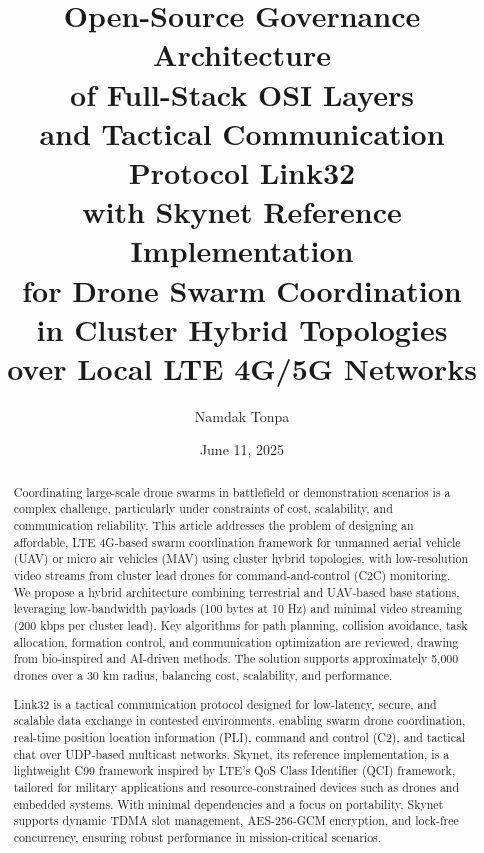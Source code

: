 \documentclass{article}
\begin{document}

\title { Open-Source Governance Architecture       \\
         of Full-Stack OSI Layers                   \\
         and Tactical Communication Protocol Link32  \\
         with Skynet Reference Implementation         \\
         for Drone Swarm Coordination \\
         in Cluster Hybrid Topologies  \\
         over Local LTE 4G/5G Networks  \\ }

\author{Namdak Tonpa}
\date{June 11, 2025}
\maketitle

\begin{abstract}
Coordinating large-scale drone swarms in battlefield or demonstration scenarios
is a complex challenge, particularly under constraints of cost, scalability,
and communication reliability. This article addresses the problem of designing an affordable,
LTE 4G-based swarm coordination framework for unmanned aerial vehicle (UAV)
or micro air vehicles (MAV) using cluster hybrid topologies,
with low-resolution video streams from cluster lead drones for
command-and-control (C2C) monitoring. We propose a hybrid architecture combining
terrestrial and UAV-based base stations, leveraging low-bandwidth
payloads (100 bytes at 10 Hz) and minimal video streaming (200 kbps per cluster lead).
Key algorithms for path planning, collision avoidance, task allocation, formation control,
and communication optimization are reviewed, drawing from bio-inspired and AI-driven methods.
The solution supports approximately 5,000 drones over a 30 km radius, balancing cost,
scalability, and performance.

Link32 is a tactical communication protocol designed for low-latency, secure, and scalable data
exchange in contested environments, enabling swarm drone coordination, real-time position location
information (PLI), command and control (C2), and tactical chat over UDP-based multicast networks.
Skynet, its reference implementation, is a lightweight C99 framework inspired by LTE’s QoS Class
Identifier (QCI) framework, tailored for military applications and resource-constrained devices
such as drones and embedded systems. With minimal dependencies and a focus on portability, Skynet
supports dynamic TDMA slot management, AES-256-GCM encryption, and lock-free concurrency, ensuring
robust performance in mission-critical scenarios.
\end{abstract}
\end{document}
